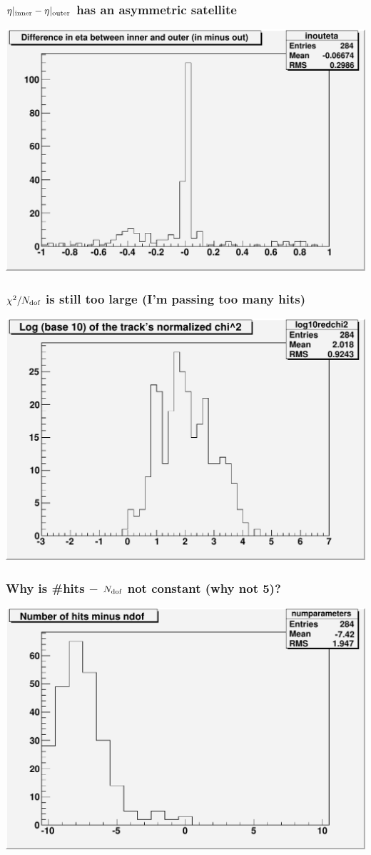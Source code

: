 \documentclass[12pt,compress]{beamer}
\begin{document}
\begin{frame}
\frametitle{$\eta|_{\mbox{\scriptsize inner}} - \eta|_{\mbox{\scriptsize outer}}$ has an asymmetric satellite}
\begin{center}
\includegraphics[width=0.8\linewidth]{inouteta}
\end{center}
\end{frame}

\begin{frame}
\frametitle{$\chi^2/N_{\mbox{\scriptsize dof}}$ is still too large (I'm passing too many hits)}
\begin{center}
\includegraphics[width=0.8\linewidth]{log10redchi2}
\end{center}
\end{frame}

\begin{frame}
\frametitle{Why is \#hits $-$ $N_{\mbox{\scriptsize dof}}$ not constant (why not 5)?}
\begin{center}
\includegraphics[width=0.8\linewidth]{numparameters}
\end{center}
\end{frame}
\end{document}
